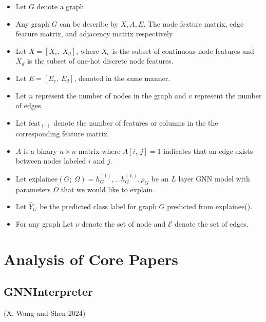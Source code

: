 \documentclass[
  11pt,
  letterpaper,
]{article}
\begin{document}
\begin{itemize}
\item
  Let \(G\) denote a graph.
\item
  Any graph \(G\) can be describe by \(X, A, E\). The node feature
  matrix, edge feature matrix, and adjacency matrix respectively
\item
  Let \(X = [X_c, \ X_d]\), where \(X_c\) is the subset of continuous
  node features and \(X_d\) is the subset of one-hot discrete node
  features.
\item
  Let \(E = [E_c, \ E_d]\), denoted in the same manner.
\item
  Let \(n\) represent the number of nodes in the graph and \(v\)
  represent the number of edges.
\item
  Let \(\text{feat}_{(.)}\) denote the number of features or columns in
  the the corresponding feature matrix.
\item
  \(A\) is a binary \(n \times n\) matrix where \(A[i, \ j] = 1\)
  indicates that an edge exists between nodes labeled \(i\) and \(j\).
\item
  Let
  \(\text{explainee}(G; \ \Omega) = h^{(1)}_G, \dots h^{(L)}_G, \rho_G\)
  be an \(L\) layer GNN model with parameters \(\Omega\) that we would
  like to explain.
\item
  Let \(\hat Y_G\) be the predicted class label for graph \(G\)
  predicted from explainee().
\item
  For any graph Let \(\nu\) denote the set of node and \(\mathcal{E}\)
  denote the set of edges.
\end{itemize}

\hypertarget{analysis-of-core-papers}{%
\section{Analysis of Core Papers}\label{analysis-of-core-papers}}

\hypertarget{gnninterpreter}{%
\subsection{GNNInterpreter}\label{gnninterpreter}}

(X. Wang and Shen 2024)
\end{document}
